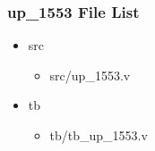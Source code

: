 \subsubsection{up\_1553 File List}
\begin{itemize}
\item src
	\begin{itemize}
	\item src/up\_1553.v
	\end{itemize}
\item tb
	\begin{itemize}
	\item tb/tb\_up\_1553.v
	\end{itemize}
\end{itemize}
